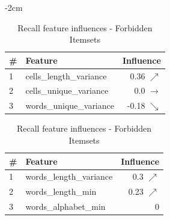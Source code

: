 \begin{table}[H]
	\centering
	\addtolength{\leftskip} {-2cm}
	\addtolength{\rightskip}{-2cm}
	\captionsetup[subtable]{position = below}
	\captionsetup[table]{position=top}
	\caption{Top feature influences - Forbidden Itemsets}
	\label{tab:feature_influences_ForbiddenItemsets}
		\begin{subtable}{0.5\linewidth}
		\centering
\begin{tabular}{llr}
\toprule
 \# &                  Feature &          Influence \\
\midrule
 1 &  cells\_length\_variance &    0.36 $\nearrow$ \\
 2 &  cells\_unique\_variance &  0.0 $\rightarrow$ \\
 3 &  words\_unique\_variance &   -0.18 $\searrow$ \\
\bottomrule
\end{tabular}
		\caption{Precision feature influences - Forbidden Itemsets}
		\label{tab:prec_feature_influences_ForbiddenItemsets}
	\end{subtable}
	\hspace*{4em}
	\begin{subtable}{0.5\linewidth}
		\centering
\begin{tabular}{llr}
\toprule
 \# &                  Feature &        Influence \\
\midrule
 1 &  words\_length\_variance &   0.3 $\nearrow$ \\
 2 &       words\_length\_min &  0.23 $\nearrow$ \\
 3 &     words\_alphabet\_min &                0 \\
\bottomrule
\end{tabular}
		\caption{Recall feature influences - Forbidden Itemsets}
		\label{tab:rec_feature_influences_ForbiddenItemsets}
	\end{subtable}%
\end{table}



